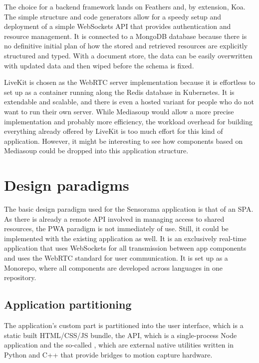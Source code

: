 The choice for a backend framework lands on Feathers and, by extension, Koa. The simple structure and code generators allow for a speedy setup and deployment of a simple WebSockets \ac{API} that provides authentication and resource management. It is connected to a MongoDB database because there is no definitive initial plan of how the stored and retrieved resources are explicitly structured and typed. With a document store, the data can be easily overwritten with updated data and then wiped before the schema is fixed.

LiveKit is chosen as the WebRTC server implementation because it is effortless to set up as a container running along the Redis database in Kubernetes. It is extendable and scalable, and there is even a hosted variant for people who do not want to run their own server. While Mediasoup would allow a more precise implementation and probably more efficiency, the workload overhead for building everything already offered by LiveKit is too much effort for this kind of application. However, it might be interesting to see how components based on Mediasoup could be dropped into this application structure.

\section{Design paradigms}

The basic design paradigm used for the Sensorama application is that of an \ac{SPA}. As there is already a remote API involved in managing access to shared resources, the \ac{PWA} paradigm is not immediately of use. Still, it could be implemented with the existing application as well. It is an exclusively real-time application that uses WebSockets for all transmission between app components and uses the WebRTC standard for user communication. It is set up as a Monorepo, where all components are developed across languages in one repository.

\subsection{Application partitioning}

The application's custom part is partitioned into the user interface, which is a static built \ac{HTML}/\ac{CSS}/\ac{JS} bundle, the \ac{API}, which is a single-process Node application and the so-called , which are external native utilities written in Python and C++ that provide bridges to motion capture hardware.

